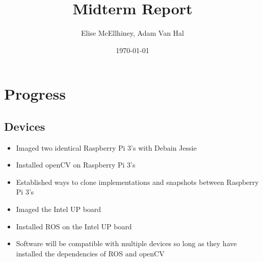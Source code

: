 \documentclass[11pt]{amsart}
\title{Midterm Report}
\author{Elise McEllhiney, Adam Van Hal}
\date{\today}                                           %
\begin{document}
\maketitle

\section{Progress}
\subsection{Devices}
\begin{itemize}
\item Imaged two identical Raspberry Pi 3's with Debain Jessie
\item Installed openCV on Raspberry Pi 3's
\item Established ways to clone implementations and snapshots between Raspberry Pi 3's
\item Imaged the Intel UP board
\item Installed ROS on the Intel UP board
\item Software will be compatible with multiple devices so long as they have installed the dependencies of ROS and openCV
\end{itemize}
\end{document}
